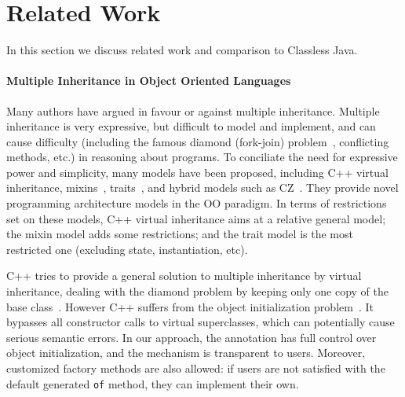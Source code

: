 \section{Related Work}\label{sec:related}
In this section we discuss related work and comparison to Classless Java.



\paragraph{Multiple Inheritance in Object Oriented Languages}
Many authors have argued in favour or against multiple inheritance.  Multiple
inheritance is very expressive, but difficult to model and implement, and can
cause difficulty (including the famous diamond (fork-join)
problem~\cite{bracha90mixin,Sak89dis}, conflicting methods, etc.) in reasoning about
programs. To conciliate the need for expressive power and simplicity, many
models have been proposed, including C++ virtual inheritance,
mixins~\cite{bracha90mixin}, traits~\cite{scharli03traits}, and hybrid models
such as CZ~\cite{malayeri2009cz}.  They provide novel programming architecture
models in the OO paradigm. In terms of restrictions set on these models, C++
virtual inheritance aims at a relative general model; the mixin model adds some
restrictions; and the trait model is the most restricted one (excluding
state, instantiation, etc).

C++ tries to provide a general solution to multiple inheritance by
virtual inheritance, dealing with the diamond problem by keeping only
one copy of the base class~\cite{ellis1990annotated}. However C++
suffers from the object initialization problem~\cite{malayeri2009cz}.
It bypasses all constructor calls to virtual superclasses, which can
potentially cause serious semantic errors. In our approach, the \mixin
annotation has full control over object initialization,
and the mechanism is transparent to users. Moreover, customized factory
methods are also allowed: if users are not satisfied with the default
generated \texttt{of} method, they can implement their own.

